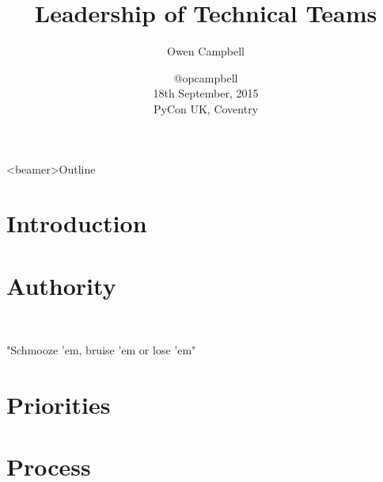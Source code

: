 \documentclass[14pt]{beamer}
\title{Leadership of Technical Teams}
\author{Owen Campbell}
\date[PyCon UK 2015]{
  @opcampbell\\
  \vspace{1cm}
  18th September, 2015\\
  PyCon UK, Coventry}
\begin{document}
\begin{frame}
  \titlepage{}
\end{frame}

{
  \begin{frame}<beamer>{Outline}
    \tableofcontents
  \end{frame}
}

  \section{Introduction}

    \blankscreen



  \section{Authority}
    \blankscreen

    \begin{frame}{}
      \begin{Huge} \faHeart \hfill \faHandGrabO \hfill \faSignOut \end{Huge}\\
      \vfill
      \begin{center}\large "Schmooze 'em, bruise 'em or lose 'em"\end{center}
    \end{frame}

  \section{Priorities}

    \begin{frame}{}
      
    \end{frame}

  \section{Process}
    \blankscreen
\end{document}
